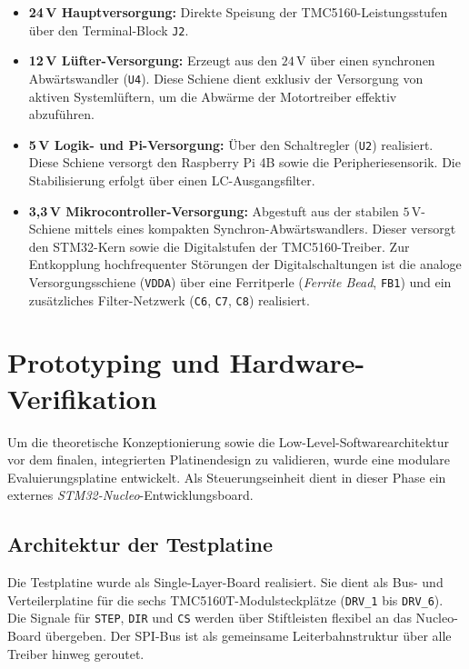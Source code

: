 \begin{itemize}
	\item \textbf{24\,V Hauptversorgung:} Direkte Speisung der TMC5160-Leistungsstufen über den Terminal-Block \texttt{J2}.
	\item \textbf{12\,V Lüfter-Versorgung:} Erzeugt aus den $24\,\text{V}$ über einen synchronen Abwärtswandler (\texttt{U4}). Diese Schiene dient exklusiv der Versorgung von aktiven Systemlüftern, um die Abwärme der Motortreiber effektiv abzuführen.
	\item \textbf{5\,V Logik- und Pi-Versorgung:} Über den Schaltregler (\texttt{U2}) realisiert. Diese Schiene versorgt den Raspberry Pi 4B sowie die Peripheriesensorik. Die Stabilisierung erfolgt über einen LC-Ausgangsfilter.
	\item \textbf{3,3\,V Mikrocontroller-Versorgung:} Abgestuft aus der stabilen $5\,\text{V}$-Schiene mittels eines kompakten Synchron-Abwärtswandlers. Dieser versorgt den STM32-Kern sowie die Digitalstufen der TMC5160-Treiber. Zur Entkopplung hochfrequenter Störungen der Digitalschaltungen ist die analoge Versorgungsschiene (\texttt{VDDA}) über eine Ferritperle (\textit{Ferrite Bead}, \texttt{FB1}) und ein zusätzliches Filter-Netzwerk (\texttt{C6}, \texttt{C7}, \texttt{C8}) realisiert.
\end{itemize}
\cite{kirasich_new}
\section{Prototyping und Hardware-Verifikation}
\label{subsec:prototyping}
Um die theoretische Konzeptionierung sowie die Low-Level-Softwarearchitektur vor dem finalen, integrierten Platinendesign zu validieren, wurde eine modulare Evaluierungsplatine entwickelt. Als Steuerungseinheit dient in dieser Phase ein externes \textit{STM32-Nucleo}-Entwicklungsboard.

\subsection{Architektur der Testplatine}
Die Testplatine wurde als Single-Layer-Board realisiert. Sie dient als Bus- und Verteilerplatine für die sechs TMC5160T-Modulsteckplätze (\texttt{DRV\_1} bis \texttt{DRV\_6}). Die Signale für \texttt{STEP}, \texttt{DIR} und \texttt{CS} werden über Stiftleisten flexibel an das Nucleo-Board übergeben. Der SPI-Bus ist als gemeinsame Leiterbahnstruktur über alle Treiber hinweg geroutet.

